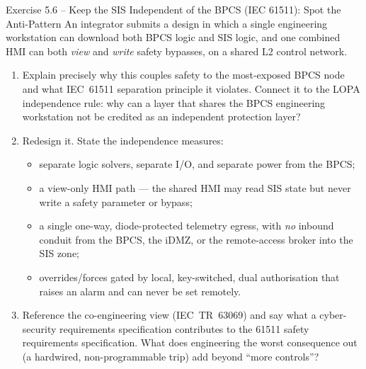 \documentclass[11pt,a4paper]{article}
\begin{document}
\begin{taskbox}{Exercise 5.6 -- Keep the SIS Independent of the BPCS (IEC 61511): Spot the Anti-Pattern}
An integrator submits a design in which a single engineering workstation can download both BPCS logic and SIS logic, and one combined HMI can both \emph{view} and \emph{write} safety bypasses, on a shared L2 control network.
\begin{enumerate}
  \item Explain precisely why this couples safety to the most-exposed BPCS node and what IEC~61511 separation principle it violates. Connect it to the LOPA independence rule: why can a layer that shares the BPCS engineering workstation not be credited as an independent protection layer?
  \item Redesign it. State the independence measures:
  \begin{itemize}\setlength{\itemsep}{1pt}
    \item separate logic solvers, separate I/O, and separate power from the BPCS;
    \item a view-only HMI path --- the shared HMI may read SIS state but never write a safety parameter or bypass;
    \item a single one-way, diode-protected telemetry egress, with \emph{no} inbound conduit from the BPCS, the iDMZ, or the remote-access broker into the SIS zone;
    \item overrides/forces gated by local, key-switched, dual authorisation that raises an alarm and can never be set remotely.
  \end{itemize}
  \item Reference the co-engineering view (IEC~TR~63069) and say what a cyber-security requirements specification contributes to the 61511 safety requirements specification. What does engineering the worst consequence out (a hardwired, non-programmable trip) add beyond ``more controls''?
\end{enumerate}
\end{taskbox}
\end{document}
